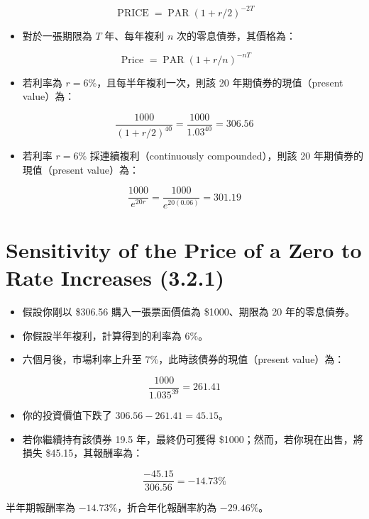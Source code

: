 \documentclass[letterpaper]{article}
\begin{document}
$$
\operatorname{PRICE}=\operatorname{PAR}(1+r / 2)^{-2 T}
$$

\begin{itemize}
	\item 對於一張期限為 \( T \) 年、每年複利 \( n \) 次的零息債券，其價格為：
\end{itemize}

$$
\text { Price }=\operatorname{PAR}(1+r / n)^{-n T}
$$

\begin{itemize}
	\item 若利率為 \( r = 6\% \)，且每半年複利一次，則該 20 年期債券的現值（present value）為：
\end{itemize}


$$
\frac{1000}{(1+r / 2)^{40}}=\frac{1000}{1.03^{40}}=306.56
$$


\begin{itemize}
	\item 若利率 \( r = 6\% \) 採連續複利（continuously compounded），則該 20 年期債券的現值（present value）為：
\end{itemize}

$$
\frac{1000}{e^{20 r}}=\frac{1000}{e^{20(0.06)}}=301.19
$$

\section*{Sensitivity of the Price of a Zero to Rate Increases (3.2.1)}
\begin{itemize}
	\item 假設你剛以 \$306.56 購入一張票面價值為 \$1000、期限為 20 年的零息債券。
	\item 你假設半年複利，計算得到的利率為 \(6\%\)。
	\item 六個月後，市場利率上升至 \(7\%\)，此時該債券的現值（present value）為：
\end{itemize}

$$
\frac{1000}{1.035^{39}}=261.41
$$

\begin{itemize}
	\item 你的投資價值下跌了 \(306.56 - 261.41 = 45.15\)。
	\item 若你繼續持有該債券 19.5 年，最終仍可獲得 \$1000；然而，若你現在出售，將損失 \$45.15，其報酬率為：
\end{itemize}

$$
\frac{-45.15}{306.56}=-14.73 \%
$$

半年期報酬率為 \(-14.73\%\)，折合年化報酬率約為 \(-29.46\%\)。
\end{document}
